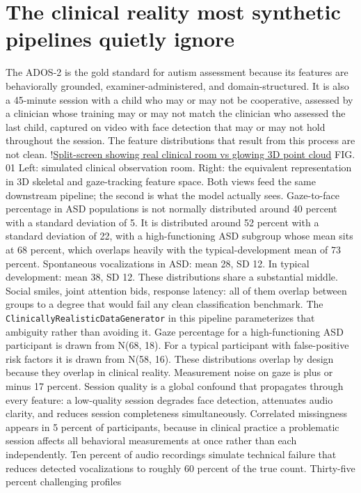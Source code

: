 \documentclass{obelus-preprint}
\begin{document}
\section{The clinical reality most synthetic pipelines quietly ignore}
The ADOS-2 is the gold standard for autism assessment because its features are behaviorally grounded, examiner-administered, and domain-structured. It is also a 45-minute session with a child who may or may not be cooperative, assessed by a clinician whose training may or may not match the clinician who assessed the last child, captured on video with face detection that may or may not hold throughout the session. The feature distributions that result from this process are not clean.
!\href{point_cloud.png}{Split-screen showing real clinical room vs glowing 3D point cloud}
FIG. 01 Left: simulated clinical observation room. Right: the equivalent representation in 3D skeletal and gaze-tracking feature space. Both views feed the same downstream pipeline; the second is what the model actually sees.
Gaze-to-face percentage in ASD populations is not normally distributed around 40 percent with a standard deviation of 5. It is distributed around 52 percent with a standard deviation of 22, with a high-functioning ASD subgroup whose mean sits at 68 percent, which overlaps heavily with the typical-development mean of 73 percent. Spontaneous vocalizations in ASD: mean 28, SD 12. In typical development: mean 38, SD 12. These distributions share a substantial middle. Social smiles, joint attention bids, response latency: all of them overlap between groups to a degree that would fail any clean classification benchmark.
The \texttt{ClinicallyRealisticDataGenerator} in this pipeline parameterizes that ambiguity rather than avoiding it. Gaze percentage for a high-functioning ASD participant is drawn from N(68, 18). For a typical participant with false-positive risk factors it is drawn from N(58, 16). These distributions overlap by design because they overlap in clinical reality. Measurement noise on gaze is plus or minus 17 percent. Session quality is a global confound that propagates through every feature: a low-quality session degrades face detection, attenuates audio clarity, and reduces session completeness simultaneously. Correlated missingness appears in 5 percent of participants, because in clinical practice a problematic session affects all behavioral measurements at once rather than each independently. Ten percent of audio recordings simulate technical failure that reduces detected vocalizations to roughly 60 percent of the true count.
Thirty-five percent challenging profiles
\end{document}
